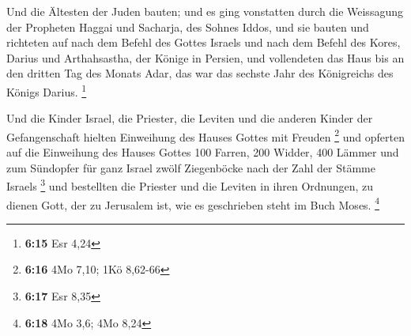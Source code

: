  Und die Ältesten der Juden bauten; und es ging vonstatten
durch die Weissagung der Propheten Haggai und Sacharja, des Sohnes
Iddos, und sie bauten und richteten auf nach dem Befehl des Gottes
Israels und nach dem Befehl des Kores, Darius und Arthahsastha, der
Könige in Persien,  und vollendeten das Haus bis an den
dritten Tag des Monats Adar, das war das sechste Jahr des Königreichs
des Königs Darius. \footnote{\textbf{6:15} Esr 4,24}

 Und die Kinder Israel, die Priester, die Leviten und die
anderen Kinder der Gefangenschaft hielten Einweihung des Hauses Gottes
mit Freuden \footnote{\textbf{6:16} 4Mo 7,10; 1Kö 8,62-66} 
und opferten auf die Einweihung des Hauses Gottes 100 Farren, 200
Widder, 400 Lämmer und zum Sündopfer für ganz Israel zwölf Ziegenböcke
nach der Zahl der Stämme Israels \footnote{\textbf{6:17} Esr 8,35}
 und bestellten die Priester und die Leviten in ihren
Ordnungen, zu dienen Gott, der zu Jerusalem ist, wie es geschrieben
steht im Buch Moses. \footnote{\textbf{6:18} 4Mo 3,6; 4Mo 8,24}


